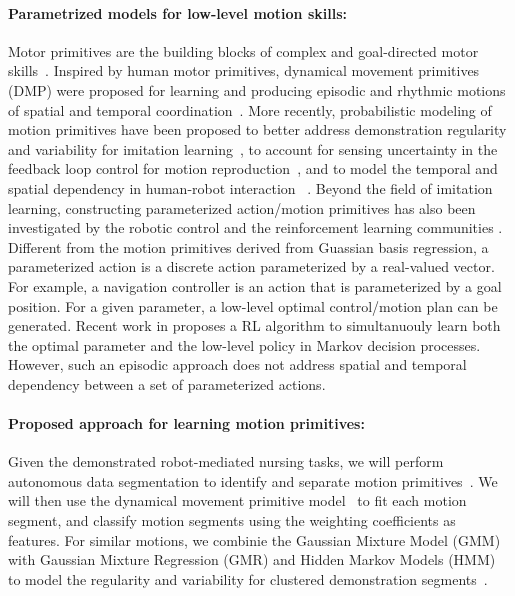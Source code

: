 \documentclass[letterpaper, 11 pt, onecolumn]{article}
\begin{document}
\paragraph*{Parametrized models for low-level motion skills:} Motor primitives are the building blocks of complex and goal-directed motor skills~\cite{flash2005motor}. Inspired by human motor primitives, dynamical movement primitives (DMP) were proposed for learning and producing episodic and rhythmic motions of spatial and temporal coordination~\cite{ijspeert2013dynamical}. More recently, probabilistic modeling of motion primitives have been proposed to better address demonstration regularity and variability for imitation learning~\cite{calinon2007learning,calinon2010learning}, to account for sensing uncertainty in the feedback loop control for motion reproduction~\cite{meier2016probabilistic}, and to model the temporal and spatial dependency in human-robot interaction ~\cite{maeda2017phase}. Beyond the field of imitation learning, constructing parameterized action/motion primitives has also been investigated by the robotic control \cite{fu2013bottom} and the reinforcement learning communities \cite{masson2016reinforcement}. Different from the motion primitives derived from Guassian basis regression, a parameterized action is a discrete action parameterized by a real-valued vector. For example, a navigation controller is an action that is parameterized by a goal position. For a given parameter, a low-level optimal control/motion plan can be generated. Recent work in \cite{masson2016reinforcement} proposes a RL algorithm to simultanuouly learn both the optimal parameter and the low-level policy in Markov decision processes. However, such an episodic approach does not address spatial and temporal dependency between a set of parameterized actions. 


\paragraph*{Proposed approach for learning motion primitives:} Given the demonstrated robot-mediated nursing tasks, we will perform autonomous data segmentation to identify and separate motion primitives~\cite{fod2002automated, barbivc2004segmenting, meier2012movement}. We will then use the dynamical movement primitive model~\cite{ijspeert2013dynamical} to fit each motion segment, and classify motion segments using the weighting coefficients as features. For similar motions, we combinie the Gaussian Mixture Model (GMM) with Gaussian Mixture Regression (GMR) and Hidden Markov Models (HMM) to model the regularity and variability for clustered demonstration segments~\cite{calinon2010learning}. 
\end{document}
